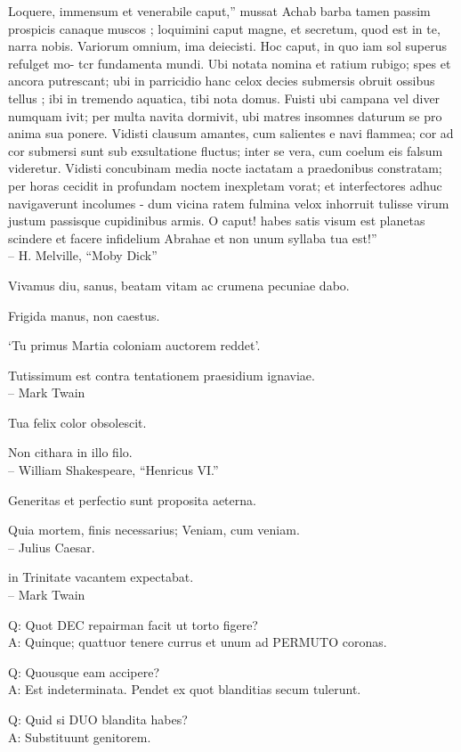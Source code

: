 \documentclass[titlepage,12pt]{memoir}
\begin{document}
Loquere, immensum et venerabile caput,” mussat Achab
barba tamen passim prospicis canaque muscos ; loquimini
caput magne, et secretum, quod est in te, narra nobis. Variorum omnium,
ima deiecisti. Hoc caput, in quo iam sol superus refulget
mo- tcr fundamenta mundi. Ubi notata nomina et ratium rubigo;
spes et ancora putrescant; ubi in parricidio hanc celox
decies submersis obruit ossibus tellus ; ibi in tremendo
aquatica, tibi nota domus. Fuisti ubi campana vel
diver numquam ivit; per multa navita dormivit, ubi matres insomnes
daturum se pro anima sua ponere. Vidisti clausum amantes, cum
salientes e navi flammea; cor ad cor submersi sunt sub exsultatione
fluctus; inter se vera, cum coelum eis falsum videretur. Vidisti
concubinam media nocte iactatam a praedonibus constratam; per horas cecidit
in profundam noctem inexpletam vorat; et interfectores adhuc navigaverunt
incolumes - dum vicina ratem fulmina velox inhorruit
tulisse virum justum passisque cupidinibus armis. O caput! habes
satis visum est planetas scindere et facere infidelium Abrahae et non unum
syllaba tua est!”
\\-- H. Melville, “Moby Dick”

Vivamus diu, sanus, beatam vitam ac crumena pecuniae dabo.

Frigida manus, non caestus.

‘Tu primus Martia coloniam auctorem reddet’.

Tutissimum est contra tentationem praesidium ignaviae.
\\-- Mark Twain

Tua felix color obsolescit.

Non cithara in illo filo.
\\-- William Shakespeare, “Henricus VI.”

Generitas et perfectio sunt proposita aeterna.

Quia mortem, finis necessarius;
Veniam, cum veniam.
\\-- Julius Caesar.

in Trinitate vacantem expectabat.
\\-- Mark Twain

Q: Quot DEC repairman facit ut torto figere?\\
A: Quinque; quattuor tenere currus et unum ad PERMUTO coronas.

Q: Quousque eam accipere?\\
A: Est indeterminata.
Pendet ex quot blanditias secum tulerunt.

Q: Quid si DUO blandita habes?\\
A: Substituunt genitorem.
\end{document}
